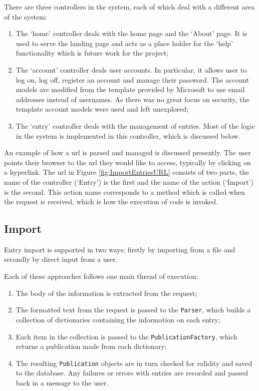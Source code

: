 There are three controllers in the system, each of which deal with a different area of the system:
\begin{enumerate}
	\item The `home' controller deals with the home page and the `About' page.  It is used to serve the landing page and acts as a place holder for the `help' functionality which is future work for the project;
	\item The `account' controller deals user accounts.  In particular, it allows user to log on, log off, register an account and manage their password.  The account models are modified from the template provided by Microsoft to use email addresses instead of usernames.  As there was no great focus on security, the template account models were used and left unexplored;
	\item The `entry' controller deals with the management of \bibtex{} entries.  Most of the logic in the system is implemented in this controller, which is discussed below.
\end{enumerate}

An example of how a \gls{url} is parsed and managed is discussed presently.  The user points their browser to the \gls{url} they would like to access, typically by clicking on a hyperlink.  The \gls{url} in Figure \ref{fig:ImportEntriesURL} consists of two parts, the name of the controller (`Entry') is the first and the name of the action (`Import') is the second.  This action name corresponds to a method which is called when the request is received, which is how the execution of code is invoked.  

\subsection{Import}
Entry import is supported in two ways: firstly by importing from a file and secondly by direct input from a user.

Each of these approaches follows one main thread of execution:
\begin{enumerate}
	\item The body of the information is extracted from the request;
	\item The \bibtex{} formatted text from the request is passed to the \texttt{Parser}, which builds a collection of dictionaries containing the information on each entry;
	\item Each item in the collection is passed to the \texttt{PublicationFactory}, which returns a publication made from each dictionary;
	\item The resulting \texttt{Publication} objects are in turn checked for validity and saved to the database. Any failures or errors with entries are recorded and passed back in a message to the user.
\end{enumerate}

